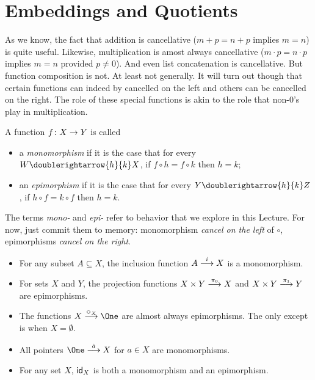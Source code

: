 \section{Embeddings and Quotients}

As we know, the fact that addition is cancellative ($m+p=n+p$ implies $m=n$) is quite useful. Likewise, multiplication is amost always cancellative ($m\cdot p=n\cdot p$ implies $m=n$ provided $p\neq 0$). And even list concatenation is cancellative. But function composition is not. At least not generally. It will turn out though that certain functions can indeed by cancelled on the left and others can be cancelled on the right. The role of these special functions is akin to the role that non-$0$'s play in multiplication.

\begin{defn}
	A function $\fromto fXY$ is called
	\begin{itemize}
		\item a \emph{monomorphism} if it is the case that for every $W\doublerightarrow{h}{k}X$, if $f\circ h=f\circ k$ then $h=k$;
		\item an \emph{epimorphism} if it is the case that 
		for every $Y\doublerightarrow{h}{k}Z$, if $h\circ f=k\circ f$ then $h=k$.
	\end{itemize}
\end{defn}

The terms \emph{mono-} and \emph{epi-} refer to behavior that we explore in this Lecture. For now, just commit them to memory: monomorphism \emph{cancel on the left} of $\circ$, epimorphisms \emph{cancel on the right}.

\begin{example}
	\begin{itemize}
	\item For any subset $A\subseteq X$, the inclusion function $\sfromto iAX$ is a monomorphism.
	\item  For sets $X$ and $Y$, the projection functions $\sfromto {\pi_0}{X\times Y}X$ and $\sfromto {\pi_1}{X\times Y}Y$ are epimorphisms.
	\item The functions $\sfromto {\Diamond_X}X\One$ are almost always epimorphisms. The only except is when $X=\emptyset$.
	\item All pointers $\sfromto {\hat a}{\One}X$ for $a\in X$ are monomorphisms.
	\item For any set $X$, $\id_X$ is both a monomorphism and an epimorphism.
	\end{itemize}
\end{example}

